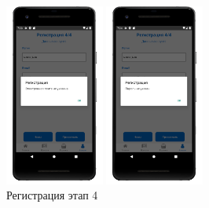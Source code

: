\begin{figure}[!htb]
\begin{minipage}{0.19\textwidth}
        \includegraphics[height=6cm]
        {images/mobile/registration/email.png}
    \end{minipage}
    \begin{minipage}{0.19\textwidth}
        \centering

        \includegraphics[height=6cm]
        {images/mobile/registration/password.png}
    \end{minipage}

    \caption{Регистрация этап 4}
    \label{fig:test_registration_step4}
\end{figure}

